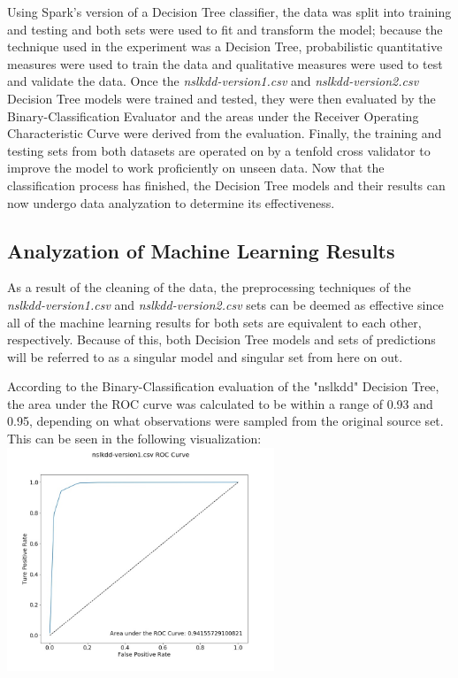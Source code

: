 \documentclass[a4paper,12pt]{IEEEtran}
\begin{document}
Using Spark's version of a Decision Tree classifier, the data was split into training and testing and both sets were used to fit and transform the model; because the technique used in the experiment was a Decision Tree, probabilistic quantitative measures were used to train the data and qualitative measures were used to test and validate the data. Once the \textit{nslkdd-version1.csv} and \textit{nslkdd-version2.csv} Decision Tree models were trained and tested, they were then evaluated by the Binary-Classification Evaluator and the areas under the Receiver Operating Characteristic Curve were derived from the evaluation. Finally, the training and testing sets from both datasets are operated on by a tenfold cross validator to improve the model to work proficiently on unseen data. Now that the classification process has finished, the Decision Tree models and their results can now undergo data analyzation to determine its effectiveness.

\subsection{Analyzation of Machine Learning Results}
As a result of the cleaning of the data, the preprocessing techniques of the \textit{nslkdd-version1.csv} and \textit{nslkdd-version2.csv} sets can be deemed as effective since all of the machine learning results for both sets are equivalent to each other, respectively. Because of this, both Decision Tree models and sets of predictions will be referred to as a singular model and singular set from here on out.

According to the Binary-Classification evaluation of the "nslkdd" Decision Tree, the area under the ROC curve was calculated to be within a range of 0.93 and 0.95, depending on what observations were sampled from the original source set. This can be seen in the following visualization:
\includegraphics[width=8cm]{v1_roc}
\end{document}
